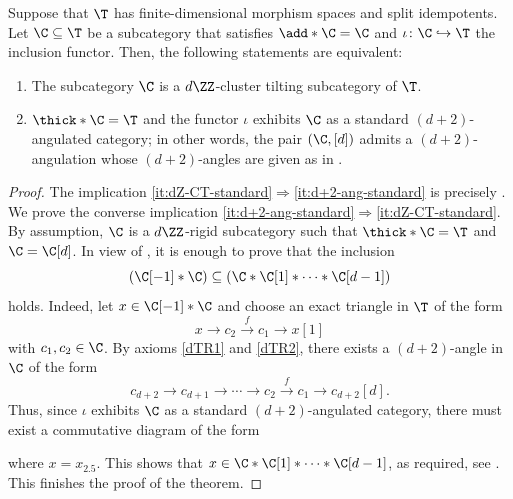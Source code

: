 \documentclass[a4paper]{amsart}
\begin{document}
\begin{theorem}
  \label{thm:standard_d+2-angulated_characterisation}
  Suppose that $\T$ has finite-dimensional morphism spaces and split
  idempotents. Let $\C\subseteq\T$ be a subcategory that satisfies
  $\add*{\C}=\C$ and $\iota\colon\C\hookrightarrow\T$ the inclusion functor.
  Then, the following statements are equivalent:
  \begin{enumerate}
  \item\label{it:dZ-CT-standard} The subcategory $\C$ is a $d\ZZ$-cluster
    tilting subcategory of $\T$.
  \item\label{it:d+2-ang-standard} $\thick*{\C}=\T$ and the functor $\iota$
    exhibits $\C$ as a standard $(d+2)$-angulated category; in other words, the
    pair $(\C,[d])$ admits a $(d+2)$-angulation whose $(d+2)$-angles are given
    as in .
  \end{enumerate}
\end{theorem}
\begin{proof}
  The implication
  \eqref{it:dZ-CT-standard}$\Rightarrow$\eqref{it:d+2-ang-standard} is precisely
  . We prove the converse implication
  \eqref{it:d+2-ang-standard}$\Rightarrow$\eqref{it:dZ-CT-standard}. By
  assumption, $\C$ is a $d\ZZ$-rigid subcategory such that $\thick*{\C}=\T$ and
  $\C=\C[d]$. In view of , it is enough to
  prove that the inclusion
  \[
    (\C[-1]*\C)\subseteq(\C*\C[1]*\cdots*\C[d-1])
  \]
  holds. Indeed, let $x\in\C[-1]*\C$ and choose an exact triangle in $\T$ of the
  form
  \[
    x\to c_2\xrightarrow{f} c_1\to x[1]
  \]
  with $c_1,c_2\in\C$. By axioms \eqref{dTR1} and \eqref{dTR2}, there exists a
  $(d+2)$-angle in $\C$ of the form
  \[
    c_{d+2}\to c_{d+1}\to\cdots\to c_2\xrightarrow{f}c_1\to c_{d+2}[d].
  \]
  Thus, since $\iota$ exhibits $\C$ as a standard $(d+2)$-angulated category,
  there must exist a commutative diagram of the form
  \begin{center}
  \end{center}
  where $x=x_{2.5}$. This shows that $x\in\C*\C[1]*\cdots*\C[d-1]$, as required,
  see . This finishes the proof of the theorem.
\end{proof}
\end{document}
